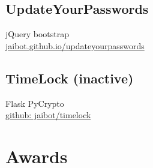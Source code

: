 \documentclass[]{resume}
\begin{document}
\begin{minipage}[t]{0.33\textwidth}
\subsection{UpdateYourPasswords}
jQuery \textbullet{} bootstrap\\
\href{http://jaibot.github.io/updateyourpasswords}{jaibot.github.io/updateyourpasswords}

\sectionsep

\subsection{TimeLock (inactive)}
Flask \textbullet{} PyCrypto \\
\href{http://github.com/jaibot/timelock}{github: jaibot/timelock}

\sectionsep







\section{Awards}

\end{minipage}
\end{document}
